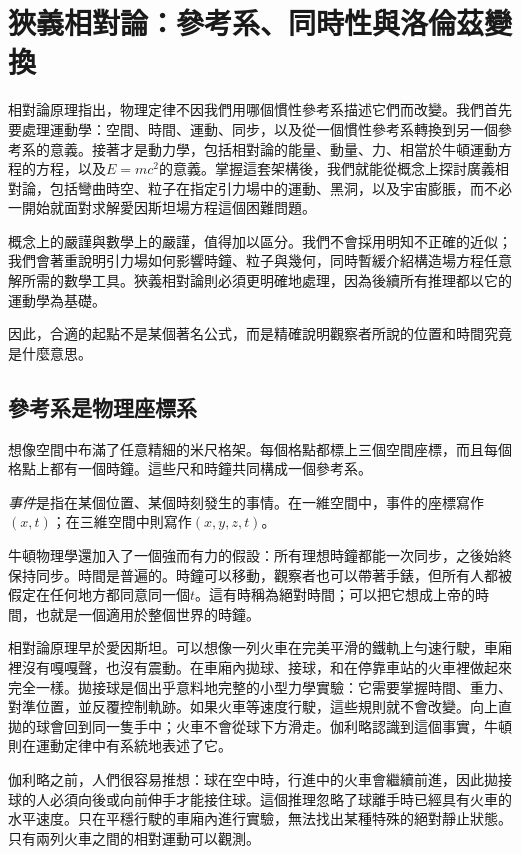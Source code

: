 \chapter{狹義相對論：參考系、同時性與洛倫茲變換}

相對論原理指出，物理定律不因我們用哪個慣性參考系描述它們而改變。我們首先要處理運動學：空間、時間、運動、同步，以及從一個慣性參考系轉換到另一個參考系的意義。接著才是動力學，包括相對論的能量、動量、力、相當於牛頓運動方程的方程，以及\(E=mc^2\)的意義。掌握這套架構後，我們就能從概念上探討廣義相對論，包括彎曲時空、粒子在指定引力場中的運動、黑洞，以及宇宙膨脹，而不必一開始就面對求解愛因斯坦場方程這個困難問題。

概念上的嚴謹與數學上的嚴謹，值得加以區分。我們不會採用明知不正確的近似；我們會著重說明引力場如何影響時鐘、粒子與幾何，同時暫緩介紹構造場方程任意解所需的數學工具。狹義相對論則必須更明確地處理，因為後續所有推理都以它的運動學為基礎。

因此，合適的起點不是某個著名公式，而是精確說明觀察者所說的位置和時間究竟是什麼意思。

\section{參考系是物理座標系}

想像空間中布滿了任意精細的米尺格架。每個格點都標上三個空間座標，而且每個格點上都有一個時鐘。這些尺和時鐘共同構成一個參考系。

\begin{definition}
\emph{事件}是指在某個位置、某個時刻發生的事情。在一維空間中，事件的座標寫作\((x,t)\)；在三維空間中則寫作\((x,y,z,t)\)。
\end{definition}

牛頓物理學還加入了一個強而有力的假設：所有理想時鐘都能一次同步，之後始終保持同步。時間是普遍的。時鐘可以移動，觀察者也可以帶著手錶，但所有人都被假定在任何地方都同意同一個\(t\)。這有時稱為絕對時間；可以把它想成上帝的時間，也就是一個適用於整個世界的時鐘。

相對論原理早於愛因斯坦。可以想像一列火車在完美平滑的鐵軌上勻速行駛，車廂裡沒有嘎嘎聲，也沒有震動。在車廂內拋球、接球，和在停靠車站的火車裡做起來完全一樣。拋接球是個出乎意料地完整的小型力學實驗：它需要掌握時間、重力、對準位置，並反覆控制軌跡。如果火車等速度行駛，這些規則就不會改變。向上直拋的球會回到同一隻手中；火車不會從球下方滑走。伽利略認識到這個事實，牛頓則在運動定律中有系統地表述了它。

伽利略之前，人們很容易推想：球在空中時，行進中的火車會繼續前進，因此拋接球的人必須向後或向前伸手才能接住球。這個推理忽略了球離手時已經具有火車的水平速度。只在平穩行駛的車廂內進行實驗，無法找出某種特殊的絕對靜止狀態。只有兩列火車之間的相對運動可以觀測。

